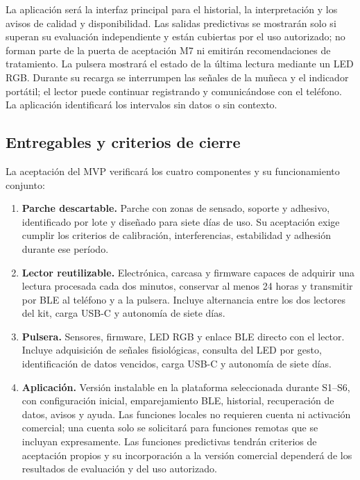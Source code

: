 La aplicación será la interfaz principal para el historial, la interpretación y los avisos de calidad y disponibilidad. Las salidas predictivas se mostrarán solo si superan su evaluación independiente y están cubiertas por el uso autorizado; no forman parte de la puerta de aceptación M7 ni emitirán recomendaciones de tratamiento. La pulsera mostrará el estado de la última lectura mediante un LED RGB. Durante su recarga se interrumpen las señales de la muñeca y el indicador portátil; el lector puede continuar registrando y comunicándose con el teléfono. La aplicación identificará los intervalos sin datos o sin contexto.

\subsection{Entregables y criterios de cierre}
La aceptación del MVP verificará los cuatro componentes y su funcionamiento conjunto:
\begin{enumerate}
\item \textbf{Parche descartable.} Parche con zonas de sensado, soporte y adhesivo, identificado por lote y diseñado para siete días de uso. Su aceptación exige cumplir los criterios de calibración, interferencias, estabilidad y adhesión durante ese período.
\item \textbf{Lector reutilizable.} Electrónica, carcasa y firmware capaces de adquirir una lectura procesada cada dos minutos, conservar al menos 24 horas y transmitir por BLE al teléfono y a la pulsera. Incluye alternancia entre los dos lectores del kit, carga USB-C y autonomía de siete días.
\item \textbf{Pulsera.} Sensores, firmware, LED RGB y enlace BLE directo con el lector. Incluye adquisición de señales fisiológicas, consulta del LED por gesto, identificación de datos vencidos, carga USB-C y autonomía de siete días.
\item \textbf{Aplicación.} Versión instalable en la plataforma seleccionada durante S1--S6, con configuración inicial, emparejamiento BLE, historial, recuperación de datos, avisos y ayuda. Las funciones locales no requieren cuenta ni activación comercial; una cuenta solo se solicitará para funciones remotas que se incluyan expresamente. Las funciones predictivas tendrán criterios de aceptación propios y su incorporación a la versión comercial dependerá de los resultados de evaluación y del uso autorizado.
\end{enumerate}

